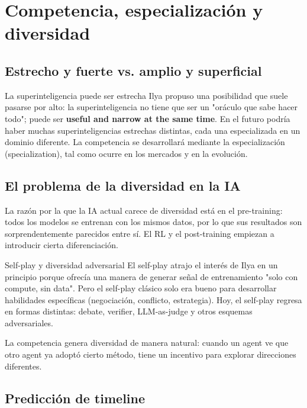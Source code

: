 \section{Competencia, especialización y diversidad}

\subsection{Estrecho y fuerte vs. amplio y superficial}

\begin{importantbox}{La superinteligencia puede ser estrecha}
Ilya propuso una posibilidad que suele pasarse por alto: la superinteligencia no tiene que ser un "oráculo que sabe hacer todo"; puede ser \textbf{useful and narrow at the same time}. En el futuro podría haber muchas superinteligencias estrechas distintas, cada una especializada en un dominio diferente. La competencia se desarrollará mediante la especialización (specialization), tal como ocurre en los mercados y en la evolución.
\end{importantbox}

\subsection{El problema de la diversidad en la IA}

La razón por la que la IA actual carece de diversidad está en el pre-training: todos los modelos se entrenan con los mismos datos, por lo que sus resultados son sorprendentemente parecidos entre sí. El RL y el post-training empiezan a introducir cierta diferenciación.

\begin{knowledgebox}{Self-play y diversidad adversarial}
El self-play atrajo el interés de Ilya en un principio porque ofrecía una manera de generar señal de entrenamiento "solo con compute, sin data". Pero el self-play clásico solo era bueno para desarrollar habilidades específicas (negociación, conflicto, estrategia). Hoy, el self-play regresa en formas distintas: debate, verifier, LLM-as-judge y otros esquemas adversariales.

La competencia genera diversidad de manera natural: cuando un agent ve que otro agent ya adoptó cierto método, tiene un incentivo para explorar direcciones diferentes.
\end{knowledgebox}

\subsection{Predicción de timeline}

